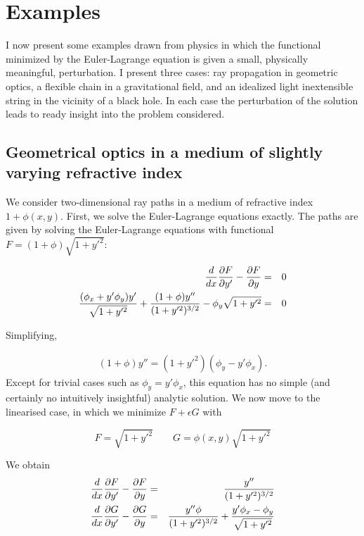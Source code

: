 \documentclass[pdflatex,sn-mathphys-num]{sn-jnl}%
\theoremstyle{thmstyleone}%
\theoremstyle{thmstyletwo}%
\theoremstyle{thmstylethree}%
\begin{document}
\section{Examples}

I now present some examples drawn from physics in which the functional
minimized by the Euler-Lagrange equation is given a small, physically
meaningful, perturbation.  I present three cases: ray propagation in
geometric optics, a flexible chain in a gravitational field, and an
idealized light inextensible string in the vicinity of a black hole.
In each case the perturbation of the solution leads to ready insight
into the problem considered.

\subsection{Geometrical optics in a medium of slightly varying refractive index}

We consider two-dimensional ray paths in a medium of refractive index
$1+\phi(x,y)$.  First, we solve the Euler-Lagrange equations exactly.
The paths are given by solving the Euler-Lagrange equations with
functional $F=(1+\phi)\sqrt{1+y'^2}$:

\begin{eqnarray}
  \frac{d}{dx}\frac{\partial{F}}{\partial{y'}}-\frac{\partial{F}}{\partial{y}} &=& 0\nonumber\\
  \frac{(\phi_x+y'\phi_y)y'}{\sqrt{1+y'^2}}+\frac{(1+\phi)y''}{(1+y'^2)^{3/2}} -
  \phi_y\sqrt{1+y'^2} &=& 0
  \end{eqnarray}

Simplifying,

\begin{eqnarray}
 (1+\phi) y'' = (1+y'^2)(\phi_y - y'\phi_x).
\end{eqnarray}
%
Except for trivial cases such as $\phi_y=y'\phi_x$, this equation has
no simple (and certainly no intuitively insightful) analytic solution.
We now move to the linearised case, in which we minimize $F+\epsilon G$ with

\begin{equation}F=\sqrt{1+y'^2}\qquad
  G=\phi(x,y)\sqrt{1+y'^2}
\end{equation}

We obtain
\begin{eqnarray}
  \frac{d}{dx}\frac{\partial{F}}{\partial{y'}} - \frac{\partial{F}}{\partial{y}} &=& \frac{y''}{(1+y'^2)^{3/2}}\nonumber\\
  \frac{d}{dx}\frac{\partial{G}}{\partial{y'}} - \frac{\partial{G}}{\partial{y}} &=& \frac{y''\phi}{(1+y'^2)^{3/2}} + \frac{y'\phi_x - \phi_y}{\sqrt{1+y'^2}}
\end{eqnarray}
\end{document}
